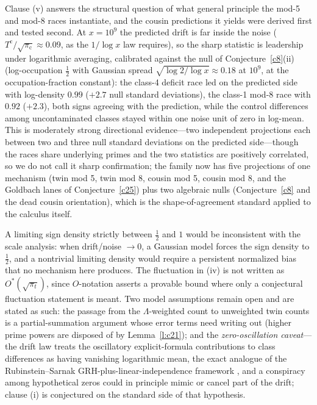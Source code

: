 \documentclass[11pt]{article}
\theoremstyle{definition}
\begin{document}
Clause (v) answers the structural question of what general principle
the mod-5 and mod-8 races instantiate, and the cousin predictions it
yields were derived first and tested second.  At $x=10^9$ the predicted
drift is far inside the
noise ($T^{\mathrm c}/\sqrt{\pi_{\mathrm c}}\approx0.09$, as the
$1/\log x$ law requires), so the sharp statistic is leadership under
logarithmic averaging, calibrated against the null of
Conjecture~\ref{c8}(ii) (log-occupation $\tfrac12$ with Gaussian
spread $\sqrt{\log2/\log x}\approx0.18$ at $10^9$, at the
occupation-fraction constant): the
class-4 deficit race led on the predicted side with log-density
$0.99$ ($+2.7$ null standard deviations), the class-1 mod-8 race
with $0.92$ ($+2.3$), both signs agreeing with the prediction, while
the control differences among uncontaminated classes stayed within
one noise unit of zero in log-mean.  This is moderately strong directional
evidence---two independent
projections each between two and three null standard deviations on
the predicted side---though the races share underlying primes and
the two statistics are positively correlated, so we do not call it sharp
confirmation;
the family now has five projections of one mechanism (twin mod 5,
twin mod 8, cousin mod 5, cousin mod 8, and the Goldbach lanes of
Conjecture~\ref{c25}) plus two algebraic nulls (Conjecture~\ref{c8}
and the dead cousin orientation), which is the shape-of-agreement
standard applied to the calculus itself.

A limiting sign density
strictly between $\tfrac12$ and $1$ would be inconsistent with the
scale analysis: when drift/noise $\to0$, a Gaussian model forces the
sign density to $\tfrac12$, and a nontrivial limiting density would
require a persistent normalized bias that no mechanism here produces.
The fluctuation in (iv) is not written as
$O^{*}(\sqrt{\pi_t})$, since $O$-notation asserts a provable bound
where only a conjectural fluctuation statement is meant.  Two model
assumptions
remain open and are stated as such: the passage from the
$\Lambda$-weighted count to unweighted twin counts is a
partial-summation argument whose error terms need writing out (higher
prime powers are disposed of by Lemma~\ref{l:c21}); and the
\emph{zero-oscillation caveat}---the drift law treats the oscillatory
explicit-formula contributions to class differences as having
vanishing logarithmic mean, the exact analogue of the
Rubinstein--Sarnak GRH-plus-linear-independence framework
\cite{RubinsteinSarnak}, and a conspiracy among hypothetical zeros
could in principle mimic or cancel part of the drift; clause (i) is
conjectured on the standard side of that hypothesis.
\end{document}
